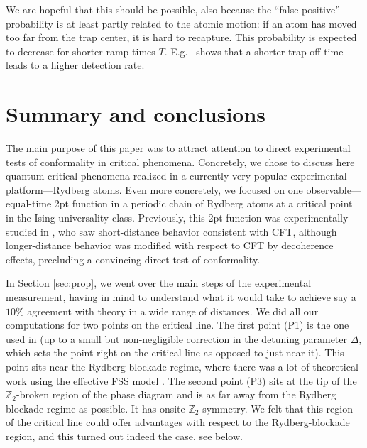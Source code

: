 \documentclass[a4paper,12pt]{article}
\theoremstyle{remark}
\theoremstyle{theorem}
\begin{document}
We are hopeful that this should be possible, also because the ``false positive'' probability is at least partly related to the atomic motion: if an atom has moved too far from the trap center, it is hard to recapture. This probability is expected to decrease for shorter ramp times $T$. E.g.~\cite[Extended Data Fig. 2]{Bernien:2017ubn} shows that a shorter trap-off time leads to a higher detection rate.

\section{Summary and conclusions}\label{sec:concl}

The main purpose of this paper was to attract attention to direct experimental tests of conformality in critical phenomena. Concretely, we chose to discuss here quantum critical phenomena realized in a currently very popular experimental platform---Rydberg atoms. Even more concretely, we focused on one observable---equal-time 2pt function in a periodic chain of Rydberg atoms at a critical point in the Ising universality class. Previously, this 2pt function was experimentally studied in \cite{Fang:2024uyf}, who saw short-distance behavior consistent with CFT, although longer-distance behavior was modified with respect to CFT by decoherence effects, precluding a convincing direct test of conformality.

In Section \ref{sec:prop}, we went over the main steps of the experimental measurement, having in mind to understand what it would take to achieve say a $10\%$ agreement with theory in a wide range of distances. We did all our computations for two points on the critical line. The first point (P1) is the one used in \cite{Fang:2024uyf} (up to a small but non-negligible correction in the detuning parameter $\Delta$, which sets the point right on the critical line as opposed to just near it). This point sits near the Rydberg-blockade regime, where there was a lot of theoretical work using the effective FSS model \cite{Slagle:2021ene,FSS}. The second point (P3) sits at the tip of the $\mathbb{Z}_2$-broken region of the phase diagram and is as far away from the Rydberg blockade regime as possible. It has onsite $\mathbb{Z}_2$ symmetry. We felt that this region of the critical line could offer advantages with respect to the Rydberg-blockade region, and this turned out indeed the case, see below.
\end{document}
